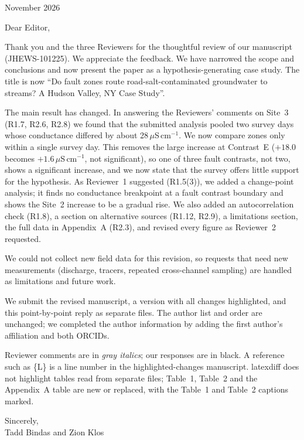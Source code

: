 \documentclass[11pt]{article}
\newcommand{\uScm}{\,$\mu$S\,cm$^{-1}$}
\newcommand{\Ln}[1]{\{L\Lref{L:#1}\}}
\begin{document}
 November 2026

\medskip
\noindent Dear Editor,

\medskip
Thank you and the three Reviewers for the thoughtful review of our manuscript (JHEWS-101225).
We appreciate the feedback. We have narrowed the scope and conclusions and now present the paper
as a hypothesis-generating case study. The title is now ``Do fault zones route
road-salt-contaminated groundwater to streams? A Hudson Valley, NY Case Study''.

The main result has changed. In answering the Reviewers' comments on Site~3 (R1.7, R2.6, R2.8)
we found that the submitted analysis pooled two survey days whose conductance differed by about
28\uScm. We now compare zones only within a single survey day. This removes the large increase
at Contrast~E ($+18.0$ becomes $+1.6$\uScm, not significant), so one of three fault contrasts,
not two, shows a significant increase, and we now state that the survey offers little support
for the hypothesis. As Reviewer~1 suggested (R1.5(3)), we added a change-point analysis; it
finds no conductance breakpoint at a fault contrast boundary and shows the Site~2 increase to be
a gradual rise. We also added an autocorrelation check (R1.8), a section on alternative sources
(R1.12, R2.9), a limitations section, the full data in Appendix~A (R2.3), and revised every
figure as Reviewer~2 requested.

We could not collect new field data for this revision, so requests that need new measurements
(discharge, tracers, repeated cross-channel sampling) are handled as limitations and future work.

We submit the revised manuscript, a version with all changes highlighted, and this
point-by-point reply as separate files. The author list and order are unchanged; we completed
the author information by adding the first author's affiliation and both ORCIDs.

Reviewer comments are in \textcolor{commentcolor}{\textit{gray italics}}; our responses are in
black. A reference such as \Ln{intro-framing} is a line number in the highlighted-changes
manuscript. latexdiff does not highlight tables read from separate files; Table~1, Table~2 and
the Appendix~A table are new or replaced, with the Table~1 and Table~2 captions marked.

\medskip
\noindent Sincerely,\\[0.5em]
Tadd Bindas and Zion Klos

\clearpage
\end{document}
